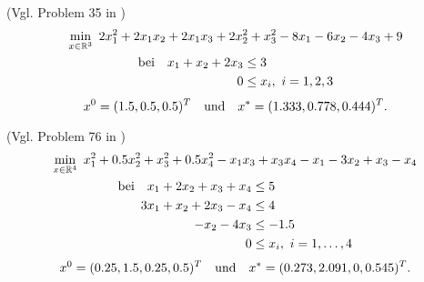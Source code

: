 \begin{testproblem}
(Vgl. Problem 35 in \cite[S.~58]{hock})
\begin{gather}
\min_{x\in\mathbb{R}^3}\ 2 x_1^2 + 2 x_1 x_2 + 2 x_1 x_3 + 2 x_2^2 + x_3^2 - 8 x_1 - 6 x_2 - 4 x_3 + 9 \notag \\
\begin{split}
\text{bei}\quad x_1 + x_2 + 2 x_3 & \leq 3 \\
0 & \leq x_i,\ i = 1,2,3 \\
\end{split}
\end{gather}
\begin{equation*}
x^0 = (1.5, 0.5, 0.5)^T \quad\text{und}\quad x^* = (1.333, 0.778, 0.444)^T.
\end{equation*}
\end{testproblem}

\begin{testproblem}
\label{test_prob:prob_Gv_hs76}
(Vgl. Problem 76 in \cite[S.~96]{hock})
\begin{gather}
\min_{x\in\mathbb{R}^4}\ x_1^2 + 0.5 x_2^2 + x_3^2 + 0.5 x_4^2 - x_1 x_3 + x_3 x_4 - x_1 - 3 x_2 + x_3 - x_4 \notag \\
\begin{split}
\text{bei}\quad x_1 + 2 x_2 + x_3 + x_4 & \leq 5 \\
3 x_1 + x_2 + 2 x_3 - x_4 & \leq 4 \\
-x_2 - 4 x_3 & \leq -1.5 \\
0 & \leq x_i,\ i = 1,\ldots,4 \\
\end{split}
\end{gather}
\begin{equation*}
x^0 = (0.25, 1.5, 0.25, 0.5)^T \quad\text{und}\quad x^* = (0.273, 2.091, 0, 0.545)^T.
\end{equation*}
\end{testproblem}
